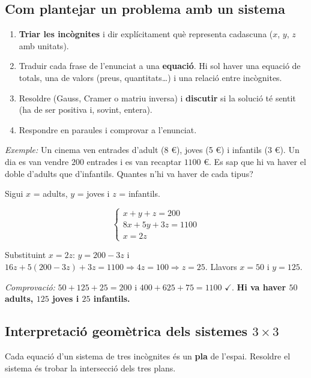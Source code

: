 \subsection{Com plantejar un problema amb un sistema}

\begin{enumerate}
\item \textbf{Triar les incògnites} i dir explícitament què representa cadascuna ($x$, $y$, $z$ amb unitats).
\item Traduir cada frase de l'enunciat a una \textbf{equació}. Hi sol haver una equació de totals, una de valors (preus, quantitats\ldots{}) i una relació entre incògnites.
\item Resoldre (Gauss, Cramer o matriu inversa) i \textbf{discutir} si la solució té sentit (ha de ser positiva i, sovint, entera).
\item Respondre en paraules i comprovar a l'enunciat.
\end{enumerate}

\emph{Exemple:} Un cinema ven entrades d'adult (8 \euro{}), joves (5 \euro{}) i infantils (3 \euro{}). Un dia es van vendre $200$ entrades i es van recaptar $1100$ \euro{}. Es sap que hi va haver el doble d'adults que d'infantils. Quantes n'hi va haver de cada tipus?

Sigui $x$ = adults, $y$ = joves i $z$ = infantils.

\begin{equation*}
\begin{cases}x+y+z=200\\8x+5y+3z=1100\\x=2z\end{cases}
\end{equation*}

Substituint $x=2z$: $y=200-3z$ i $16z+5(200-3z)+3z=1100\Rightarrow 4z=100\Rightarrow z=25$. Llavors $x=50$ i $y=125$.

\emph{Comprovació:} $50+125+25=200$ i $400+625+75=1100$ $\checkmark$. \textbf{Hi va haver $50$ adults, $125$ joves i $25$ infantils.}

\subsection{Interpretació geomètrica dels sistemes $3\times3$}

Cada equació d'un sistema de tres incògnites és un \textbf{pla} de l'espai. Resoldre el sistema és trobar la intersecció dels tres plans.

